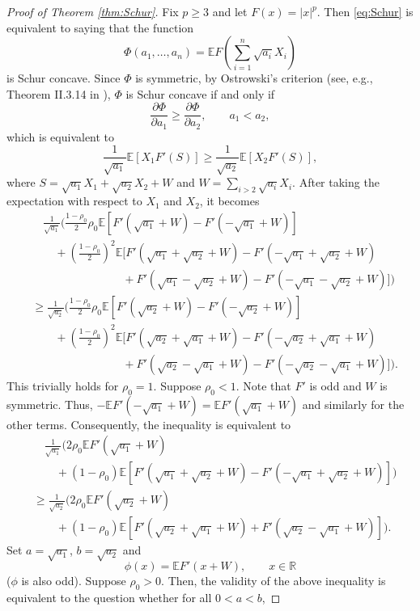 \documentclass[10pt]{article}
\newcommand{\E}{\mathbb{E}}
\newcommand{\1}{\textbf{1}}
\newcommand{\R}{\mathbb{R}}
\theoremstyle{remark}
\theoremstyle{definition}
\begin{document}
\begin{proof}[Proof of Theorem \ref{thm:Schur}]
Fix $p \geq 3$ and let $F(x) = |x|^p$. Then \eqref{eq:Schur} is equivalent to saying that the function
\[
\Phi(a_1,\ldots,a_n) = \E F\left(\sum_{i=1}^n \sqrt{a_i}X_i\right)
\]
is Schur concave. Since $\Phi$ is symmetric, by Ostrowski's criterion (see, e.g., Theorem II.3.14 in \cite{Bh}), $\Phi$ is Schur concave if and only if
\[
\frac{\partial \Phi}{\partial a_1} \geq \frac{\partial \Phi}{\partial a_2}, \qquad a_1 < a_2,
\]
which is equivalent to
\[
\frac{1}{\sqrt{a_1}}\E[ X_1F'(S)] \geq \frac{1}{\sqrt{a_2}}\E[X_2 F'(S)],
\]
where $S = \sqrt{a_1}X_1+\sqrt{a_2}X_2 + W$ and $W = \sum_{i>2} \sqrt{a_i}X_i$.
After taking the expectation with respect to $X_1$ and $X_2$, it becomes
\begin{align*}
&\quad \frac{1}{\sqrt{a_1}}\Bigg(\frac{1-\rho_0}{2}\rho_0\E[F'(\sqrt{a_1}+W) - F'(-\sqrt{a_1}+W)] \\
&\qquad+ \left(\frac{1-\rho_0}{2}\right)^2 \E[ F'(\sqrt{a_1}+ \sqrt{a_2} + W) - F'(-\sqrt{a_1} + \sqrt{a_2} + W) \\
&\qquad\qquad\qquad\qquad + F'(\sqrt{a_1} - \sqrt{a_2} + W) - F'(-\sqrt{a_1} - \sqrt{a_2} + W) ]\Bigg) \\
&\geq \frac{1}{\sqrt{a_2}}\Bigg(\frac{1-\rho_0}{2}\rho_0\E[F'(\sqrt{a_2}+W) - F'(-\sqrt{a_2}+W)] \\
&\qquad+ \left(\frac{1-\rho_0}{2}\right)^2 \E[ F'(\sqrt{a_2}+ \sqrt{a_1} + W) - F'(-\sqrt{a_2} + \sqrt{a_1} + W) \\
&\qquad\qquad\qquad\qquad + F'(\sqrt{a_2} - \sqrt{a_1} + W) - F'(-\sqrt{a_2} - \sqrt{a_1} + W) ]\Bigg).
\end{align*}
This trivially holds for $\rho_0 = 1$. Suppose $\rho_0 < 1$.
Note that $F'$ is odd and $W$ is symmetric. Thus, $-\E F'(-\sqrt{a_1}+W) = \E F'(\sqrt{a_1}+W)$ and similarly for the other terms. Consequently, the inequality is equivalent to
\begin{align*}
&\quad \frac{1}{\sqrt{a_1}}\Bigg(2\rho_0\E F'(\sqrt{a_1}+W) \\
&\qquad+ (1-\rho_0) \E[ F'(\sqrt{a_1}+ \sqrt{a_2} + W) - F'(-\sqrt{a_1} + \sqrt{a_2} + W) ]\Bigg) \\
&\geq \frac{1}{\sqrt{a_2}}\Bigg(2\rho_0\E F'(\sqrt{a_2}+W) \\
&\qquad+(1-\rho_0) \E[ F'(\sqrt{a_2}+ \sqrt{a_1} + W) + F'(\sqrt{a_2} - \sqrt{a_1} + W) ]\Bigg).
\end{align*}
Set $a = \sqrt{a_1}$, $b = \sqrt{a_2}$ and
\[
\phi(x) = \E F'(x+W), \qquad x \in \R
\]
($\phi$ is also odd). Suppose $\rho_0 > 0$. Then, the validity of the above inequality is equivalent to the question whether for all $0 < a < b$,

\end{proof}
\end{document}
